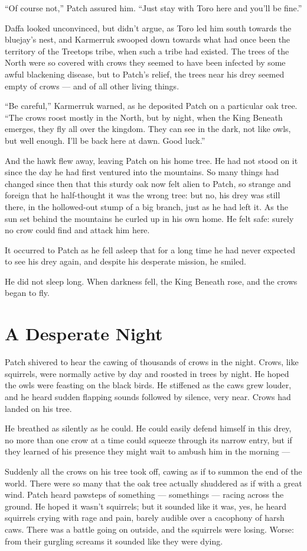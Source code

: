 \documentclass[ebook,oneside,openany,17pt]{memoir}
\renewcommand{\thechapter}{\Roman{chapter}}
\newcounter{sections}
\newcommand{\sections}[1]{%
  \section*{#1}
  \addtocounter{sections}{1}%
  \pdfbookmark[1]{#1}{section.\thechapter.\thesections}}
\begin{document}
“Of course not,” Patch assured him. “Just stay with Toro here and
you’ll be fine.”

Daffa looked unconvinced, but didn’t argue, as Toro led him south
towards the bluejay’s nest, and Karmerruk swooped down towards what
had once been the territory of the Treetops tribe, when such a tribe
had existed. The trees of the North were so covered with crows they
seemed to have been infected by some awful blackening disease, but to
Patch’s relief, the trees near his drey seemed empty of crows — and of
all other living things.

“Be careful,” Karmerruk warned, as he deposited Patch on a particular
oak tree. “The crows roost mostly in the North, but by night, when the
King Beneath emerges, they fly all over the kingdom. They can see in
the dark, not like owls, but well enough. I’ll be back here at
dawn. Good luck.”

And the hawk flew away, leaving Patch on his home tree. He had not
stood on it since the day he had first ventured into the mountains. So
many things had changed since then that this sturdy oak now felt alien
to Patch, so strange and foreign that he half-thought it was the wrong
tree: but no, his drey was still there, in the hollowed-out stump of a
big branch, just as he had left it. As the sun set behind the
mountains he curled up in his own home. He felt safe: surely no crow
could find and attack him here.

It occurred to Patch as he fell asleep that for a long time he had
never expected to see his drey again, and despite his desperate
mission, he smiled.

He did not sleep long. When darkness fell, the King Beneath rose, and
the crows began to fly.


\sections{A Desperate Night}

Patch shivered to hear the cawing of thousands of crows in the
night. Crows, like squirrels, were normally active by day and roosted
in trees by night. He hoped the owls were feasting on the black
birds. He stiffened as the caws grew louder, and he heard sudden
flapping sounds followed by silence, very near. Crows had landed on
his tree.

He breathed as silently as he could. He could easily defend himself in
this drey, no more than one crow at a time could squeeze through its
narrow entry, but if they learned of his presence they might wait to
ambush him in the morning —

Suddenly all the crows on his tree took off, cawing as if to summon
the end of the world. There were so many that the oak tree actually
shuddered as if with a great wind. Patch heard pawsteps of something —
somethings — racing across the ground. He hoped it wasn’t squirrels;
but it sounded like it was, yes, he heard squirrels crying with rage
and pain, barely audible over a cacophony of harsh caws. There was a
battle going on outside, and the squirrels were losing. Worse: from
their gurgling screams it sounded like they were dying.
\end{document}
